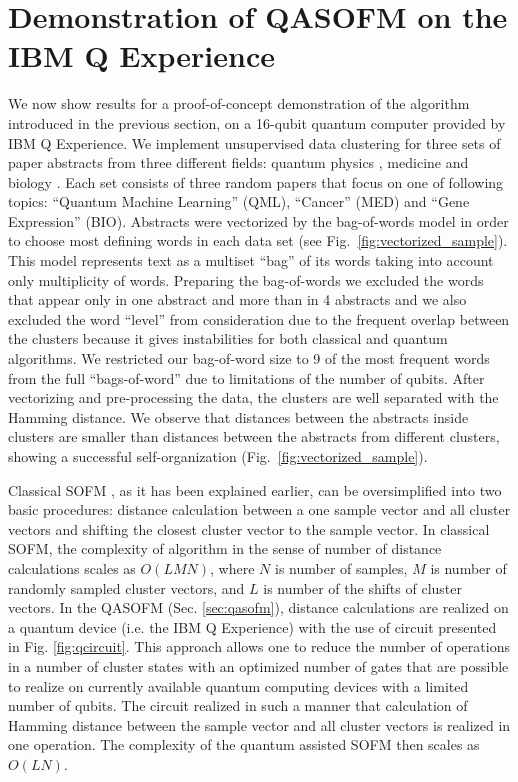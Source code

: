 \documentclass[pra,showkeys,twocolumn,showpacs]{revtex4-1}
\begin{document}
\section{Demonstration of QASOFM on the IBM Q Experience}

We now show results for a proof-of-concept demonstration of the algorithm introduced in the previous section, on a 16-qubit quantum computer provided by IBM Q Experience.  
We implement unsupervised data clustering for three sets of paper abstracts from three different fields: 
quantum physics \cite{qml0, qml1, qml2}, medicine \cite{med0, med1, med2} and biology \cite{bio0, bio1, bio2}. 
Each set consists of three random papers that focus on one of following topics: ``Quantum Machine Learning'' (QML), ``Cancer'' (MED) and ``Gene Expression'' (BIO). 
Abstracts were vectorized by the bag-of-words model in order to choose most defining words in each data set (see Fig.~\ref{fig:vectorized_sample}). 
This model represents text as a multiset ``bag'' of its words taking into account only multiplicity of words. 
Preparing the bag-of-words we excluded the words that appear only in one abstract and 
more than in 4 abstracts and we also excluded the word ``level'' from consideration due to the frequent overlap between the clusters 
because it gives instabilities for both classical and quantum algorithms. 
We restricted our bag-of-word size to 9 of the most frequent words from the full ``bags-of-word''  due to limitations of the number of qubits. 
After vectorizing and pre-processing  the data, the clusters are well separated with the Hamming distance.  
We observe that distances between the abstracts inside clusters are smaller 
than distances between the abstracts from different clusters, showing a successful self-organization (Fig.~\ref{fig:vectorized_sample}). 


Classical SOFM \cite{kohonen1990}, as it has been explained earlier, can be oversimplified into two basic procedures: 
distance calculation between a one sample vector and all cluster vectors and shifting the closest cluster vector to the sample vector. 
In classical SOFM, the complexity of algorithm in the sense of number of distance calculations scales as $O(LMN)$, 
where $N$ is number of samples, $M$ is number of randomly sampled cluster vectors, and $L$ is number of the shifts of cluster vectors.  
In the QASOFM (Sec. \ref{sec:qasofm}), distance calculations are realized on a quantum device (i.e. the IBM Q Experience) with the use of circuit presented in Fig. \ref{fig:qcircuit}. 
This approach allows one to reduce the number of operations in a number of cluster states with an optimized number of gates 
that are possible to realize on currently available quantum computing devices with a limited number of qubits. 
The circuit realized in such a manner that calculation of Hamming distance between the sample vector and all cluster vectors is realized in one operation. 
The complexity of the quantum assisted SOFM then scales as $O(LN)$. 
\end{document}
